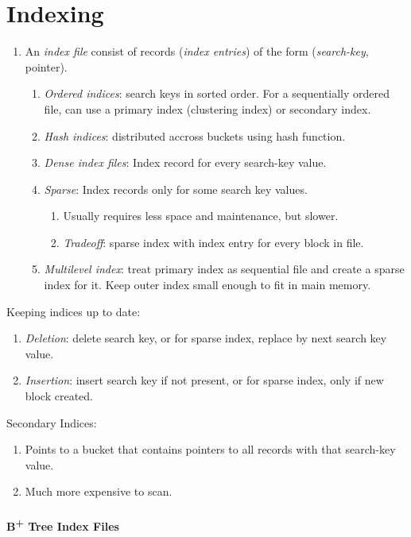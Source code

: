 \documentclass[twocolumn,english]{article}
\begin{document}
\section{Indexing}
\begin{enumerate}
\item An \emph{index file} consist of records (\emph{index entries}) of
the form (\emph{search-key}, pointer).

\begin{enumerate}
\item \emph{Ordered indices}: search keys in sorted order. For a sequentially
ordered file, can use a primary index (clustering index) or secondary
index.
\item \emph{Hash indices}: distributed accross buckets using hash function.
\item \emph{Dense index files}: Index record for every search-key value.
\item \emph{Sparse}: Index records only for some search key values.

\begin{enumerate}
\item Usually requires less space and maintenance, but slower.
\item \emph{Tradeoff}: sparse index with index entry for every block in
file.
\end{enumerate}
\item \emph{Multilevel index}: treat primary index as sequential file and
create a sparse index for it. Keep outer index small enough to fit
in main memory.
\end{enumerate}
\end{enumerate}
Keeping indices up to date:
\begin{enumerate}
\item \emph{Deletion}: delete search key, or for sparse index, replace by
next search key value.
\item \emph{Insertion}: insert search key if not present, or for sparse
index, only if new block created.
\end{enumerate}
Secondary Indices:
\begin{enumerate}
\item Points to a bucket that contains pointers to all records with that
search-key value.
\item Much more expensive to scan.
\end{enumerate}

\paragraph{B\protect\textsuperscript{+} Tree Index Files}
\end{document}
